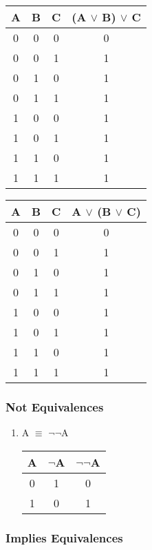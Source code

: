 \documentclass[11pt]{article}
\begin{document}
\begin{enumerate}
\begin{tabular}{| c | c | c | c |}
  \hline
  A & B & C & (A $\lor$ B) $\lor$ C \\ \hline
  0 & 0 & 0 & 0 \\
  0 & 0 & 1 & 1 \\
  0 & 1 & 0 & 1 \\
  0 & 1 & 1 & 1 \\
  1 & 0 & 0 & 1 \\
  1 & 0 & 1 & 1 \\
  1 & 1 & 0 & 1 \\
  1 & 1 & 1 & 1 \\ \hline
\end{tabular}
\quad
\begin{tabular}{| c | c | c | c |}
  \hline
  A & B & C & A $\lor$ (B $\lor$ C) \\ \hline
  0 & 0 & 0 & 0 \\
  0 & 0 & 1 & 1 \\
  0 & 1 & 0 & 1 \\
  0 & 1 & 1 & 1 \\
  1 & 0 & 0 & 1 \\
  1 & 0 & 1 & 1 \\
  1 & 1 & 0 & 1 \\
  1 & 1 & 1 & 1 \\ \hline
\end{tabular}

\end{enumerate}

\subsubsection{Not Equivalences}
\begin{enumerate}

  \item A $\equiv$ $\neg$$\neg$A

\begin{tabular}{| c | c | c |}
  \hline
  A & $\neg$A & $\neg$$\neg$A \\ \hline
  0 & 1 & 0 \\
  1 & 0 & 1 \\ \hline
\end{tabular}

\end{enumerate}

\subsubsection{Implies Equivalences}
\begin{enumerate}

\end{enumerate}
\end{document}
